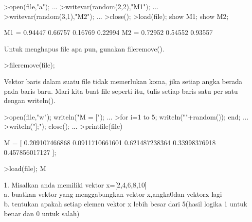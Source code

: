\documentclass{article}
\begin{document}
\begin{eulernotebook}
\begin{eulercomment}
\begin{eulercomment}
\begin{eulercomment}
\begin{eulercomment}
\begin{eulercomment}
\begin{eulercomment}
\begin{eulercomment}
\begin{eulercomment}
\begin{eulercomment}
\begin{eulercomment}
\begin{eulercomment}
\begin{eulercomment}
\begin{eulercomment}
\begin{eulercomment}
\begin{eulercomment}
\begin{eulercomment}
\begin{eulerprompt}
>open(file,"a"); ...
>writevar(random(2,2),"M1"); ...
>writevar(random(3,1),"M2"); ...
>close();
>load(file); show M1; show M2;
\end{eulerprompt}
\begin{euleroutput}
  M1 = 
    0.94447   0.66757 
    0.16769   0.22994 
  M2 = 
    0.72952 
    0.54552 
    0.93557 
\end{euleroutput}
\begin{eulercomment}
Untuk menghapus file apa pun, gunakan fileremove().
\end{eulercomment}
\begin{eulerprompt}
>fileremove(file);
\end{eulerprompt}
\begin{eulercomment}
Vektor baris dalam suatu file tidak memerlukan koma, jika setiap angka
berada pada baris baru. Mari kita buat file seperti itu, tulis setiap
baris satu per satu dengan writeln().
\end{eulercomment}
\begin{eulerprompt}
>open(file,"w"); writeln("M = ["); ...
>for i=1 to 5; writeln(""+random()); end; ...
>writeln("];"); close(); ...
>printfile(file)
\end{eulerprompt}
\begin{euleroutput}
  M = [
  0.209107466868
  0.0911710661601
  0.621487238364
  0.33998376918
  0.457856017127
  ];
\end{euleroutput}
\begin{eulerprompt}
>load(file); M
\end{eulerprompt}
\begin{euleroutput}
  [0.20911,  0.091171,  0.62149,  0.33998,  0.45786]
\end{euleroutput}
\begin{eulercomment}
1. Misalkan anda memiliki vektor x=[2,4,6,8,10]\\
a. buatkan vektor yang menggabungkan vektor x,angka0dan vektorx lagi\\
b. tentukan apakah setiap elemen vektor x lebih besar dari 5(hasil
logika 1 untuk benar dan 0 untuk salah)


\end{eulercomment}
\end{eulercomment}
\end{eulercomment}
\end{eulercomment}
\end{eulercomment}
\end{eulercomment}
\end{eulercomment}
\end{eulercomment}
\end{eulercomment}
\end{eulercomment}
\end{eulercomment}
\end{eulercomment}
\end{eulercomment}
\end{eulercomment}
\end{eulercomment}
\end{eulercomment}
\end{eulercomment}
\end{eulernotebook}
\end{document}
